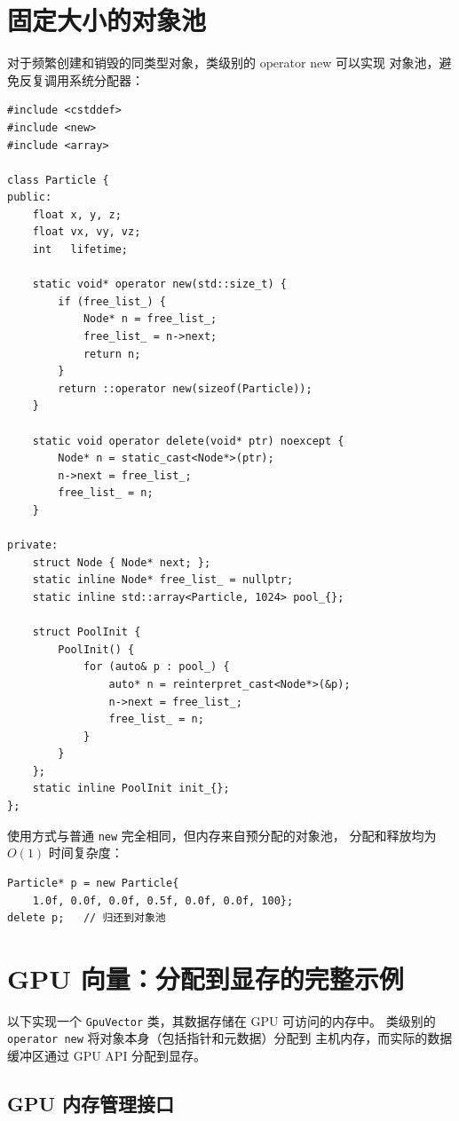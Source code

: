 \documentclass[12pt,a4paper,fontset=fandol]{ctexbook}
\begin{document}
\section{固定大小的对象池}

对于频繁创建和销毁的同类型对象，类级别的 operator new 可以实现
对象池，避免反复调用系统分配器：

\begin{lstlisting}
#include <cstddef>
#include <new>
#include <array>

class Particle {
public:
    float x, y, z;
    float vx, vy, vz;
    int   lifetime;

    static void* operator new(std::size_t) {
        if (free_list_) {
            Node* n = free_list_;
            free_list_ = n->next;
            return n;
        }
        return ::operator new(sizeof(Particle));
    }

    static void operator delete(void* ptr) noexcept {
        Node* n = static_cast<Node*>(ptr);
        n->next = free_list_;
        free_list_ = n;
    }

private:
    struct Node { Node* next; };
    static inline Node* free_list_ = nullptr;
    static inline std::array<Particle, 1024> pool_{};

    struct PoolInit {
        PoolInit() {
            for (auto& p : pool_) {
                auto* n = reinterpret_cast<Node*>(&p);
                n->next = free_list_;
                free_list_ = n;
            }
        }
    };
    static inline PoolInit init_{};
};
\end{lstlisting}

使用方式与普通 \texttt{new} 完全相同，但内存来自预分配的对象池，
分配和释放均为 $O(1)$ 时间复杂度：

\begin{lstlisting}
Particle* p = new Particle{
    1.0f, 0.0f, 0.0f, 0.5f, 0.0f, 0.0f, 100};
delete p;   // 归还到对象池
\end{lstlisting}

\section{GPU 向量：分配到显存的完整示例}

以下实现一个 \texttt{GpuVector} 类，其数据存储在 GPU 可访问的内存中。
类级别的 \texttt{operator new} 将对象本身（包括指针和元数据）分配到
主机内存，而实际的数据缓冲区通过 GPU API 分配到显存。

\subsection{GPU 内存管理接口}
\end{document}
